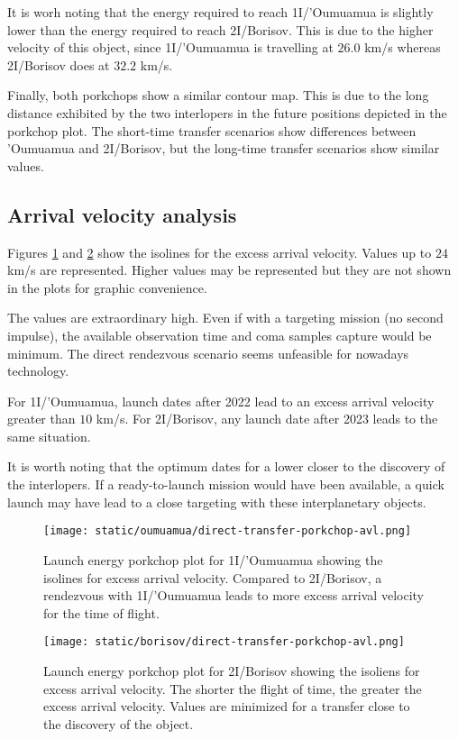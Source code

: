 It is worh noting that the energy required to reach 1I/'Oumuamua is slightly lower
than the energy required to reach 2I/Borisov. This is due to the higher velocity of
this object, since 1I/'Oumuamua is travelling at $26.0$ km/s whereas 2I/Borisov does
at $32.2$ km/s.

Finally, both porkchops show a similar contour map. This is due to the long
distance exhibited by the two interlopers in the future positions depicted in
the porkchop plot. The short-time transfer scenarios show differences between
'Oumuamua and 2I/Borisov, but the long-time transfer scenarios show similar values.

\subsection{Arrival velocity analysis}

Figures \ref{fig:oumuamua-direct-transfer-porkchop-avl} and
\ref{fig:borisov-direct-transfer-porkchop-avl} show the isolines for the excess
arrival velocity. Values up to $24$ km/s are represented. Higher values may be
represented but they are not shown in the plots for graphic convenience.

The values are extraordinary high. Even if with a targeting mission (no second
impulse), the available observation time and coma samples capture would be
minimum. The direct rendezvous scenario seems unfeasible for nowadays
technology.

For 1I/'Oumuamua, launch dates after 2022 lead to an excess arrival velocity
greater than $10$ km/s. For 2I/Borisov, any launch date after 2023 leads to the same
situation.

It is worth noting that the optimum dates for a lower closer to the discovery of
the interlopers. If a ready-to-launch mission would have been available, a quick
launch may have lead to a close targeting with these interplanetary objects.

\newpage
\begin{figure}[H]
  \centering
  \texttt{[image: static/oumuamua/direct-transfer-porkchop-avl.png]}
  \caption{Launch energy porkchop plot for 1I/'Oumuamua showing the isolines for
    excess arrival velocity. Compared to 2I/Borisov, a rendezvous with
    1I/'Oumuamua leads to more excess arrival velocity for the time of flight.}
  \label{fig:oumuamua-direct-transfer-porkchop-avl}
\end{figure}
\begin{figure}[H]
  \centering
  \texttt{[image: static/borisov/direct-transfer-porkchop-avl.png]}
  \caption{Launch energy porkchop plot for 2I/Borisov showing the isoliens for
    excess arrival velocity. The shorter the flight of time, the greater the
    excess arrival velocity. Values are minimized for a transfer close to
    the discovery of the object.}
  \label{fig:borisov-direct-transfer-porkchop-avl}
\end{figure}
\newpage

